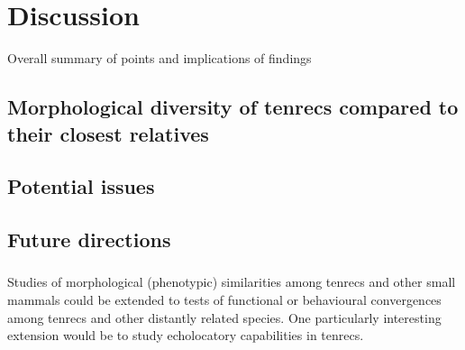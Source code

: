 \chapter{Discussion}
\label{chap:discussion}



\noindent
Overall summary of points and implications of findings

\section{Morphological diversity of tenrecs compared to their closest relatives}


\section{Potential issues}

\section{Future directions}





\subsection{}
	Studies of morphological (phenotypic) similarities among tenrecs and other small mammals could be extended to tests of functional or behavioural convergences among tenrecs and other distantly related species.
	One particularly interesting extension would be to study echolocatory capabilities in tenrecs.

